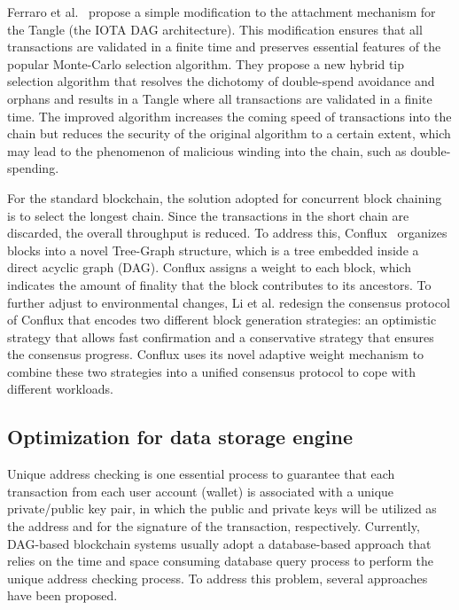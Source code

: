 \documentclass[acmsmall]{acmart}
\begin{document}
Ferraro et al.~\cite{ferraro2018iota} propose a simple modification to the attachment mechanism for the Tangle (the IOTA DAG architecture). This modification ensures that all transactions are validated in a finite time and preserves essential features of the popular Monte-Carlo selection algorithm. They propose a new hybrid tip selection algorithm that resolves the dichotomy of double-spend avoidance and orphans and results in a Tangle where all transactions are validated in a finite time.
The improved algorithm increases the coming speed of transactions into the chain but reduces the security of the original algorithm to a certain extent, which may lead to the phenomenon of malicious winding into the chain, such as double-spending.



For the standard blockchain, the solution adopted for concurrent block chaining is to select the longest chain. Since the transactions in the short chain are discarded, the overall throughput is reduced. To address this, Conflux~\cite{DBLP:journals/corr/abs-1805-03870} organizes blocks into a novel Tree-Graph structure, which is a tree embedded inside a direct acyclic graph (DAG). Conflux assigns a weight to each block, which indicates the amount of finality that the block contributes to its ancestors. To further adjust to environmental changes, Li et al.\cite{DBLP:conf/usenix/LiLZYWYXLY20} redesign the consensus protocol of Conflux that encodes two different block generation strategies: an optimistic strategy that allows fast confirmation and a conservative strategy that ensures the consensus progress. Conflux uses its novel adaptive weight mechanism to combine these two strategies into a unified consensus protocol to cope with different workloads.


\subsection{Optimization for data storage engine}
Unique address checking is one essential process to guarantee that each transaction from each user account (wallet) is associated with a unique private/public key pair, in which the public and private keys will be utilized as the address and for the signature of the transaction, respectively. Currently, DAG-based blockchain systems usually adopt a database-based approach that relies on the time and space consuming database query process to perform the unique address checking process. To address this problem, several approaches have been proposed.
\end{document}
